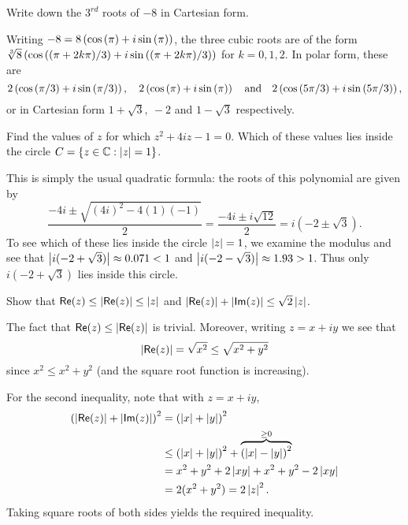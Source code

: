 \begin{questions}
\question Write down the $3^{rd}$ roots of $-8$ in Cartesian form.
\begin{answer}
Writing $-8=8 \left( \cos \left( \pi \right) + i \sin \left( \pi \right) \right)$, the three cubic roots are of the form $\sqrt[3]{8} \left( \cos \left( (\pi+2k\pi)/3 \right) + i \sin \left( (\pi+2k\pi)/3 \right) \right)$ for $k=0,1,2$.  In polar form, these are
\[
2 \left( \cos \left( \pi/3 \right) + i \sin \left( \pi/3 \right) \right), \quad 2 \left( \cos \left( \pi \right) + i \sin \left( \pi \right) \right) \quad\text{and}\quad2 \left( \cos \left( 5\pi/3 \right) + i \sin \left( 5\pi/3 \right) \right),
\]
or in Cartesian form $1+\sqrt{3},\ -2$ and $1-\sqrt{3}$ respectively.

\end{answer}

\question Find the values of $z$ for which $z^2+4iz-1=0$.  Which of these values lies inside the circle $C=\left\{z \in \mathbb{C}: \left| z \right|=1\right\}$.
\begin{answer}
This is simply the usual quadratic formula: the roots of this polynomial are given by
\[
\frac{-4i\pm \sqrt{(4i)^2-4(1)(-1)}}{2} = \frac{-4i\pm i \sqrt{12}}{2} = i (-2 \pm  \sqrt{3}).
\]
To see which of these lies inside the circle $\left| z \right|=1$, we examine the modulus and see that $\left| i(-2 + \sqrt{3}) \right| \approx 0.071<1$ and $\left| i(-2-\sqrt{3}) \right| \approx 1.93>1$. Thus only $i(-2+\sqrt{3})$ lies inside this circle.
\end{answer}


\question Show that $\textsf{Re} (z) \leq \left|  \textsf{Re} (z) \right| \leq \left| z \right|$ and $\left| \textsf{Re} (z) \right|+\left| \textsf{Im} (z) \right| \leq \sqrt{2} \left| z \right|$.
\begin{answer}
The fact that $\textsf{Re} (z) \leq \left|  \textsf{Re} (z) \right|$ is trivial.  Moreover,  writing $z=x+iy$ we see that
\[
\left| \textsf{Re}(z) \right| = \sqrt{x^2} \leq \sqrt{x^2+y^2}
\]
since $x^2 \leq x^2+y^2$ (and the square root function is increasing).

For the second inequality, note that with $z=x+iy$,
\begin{align*}
\left( \left| \textsf{Re} (z) \right|+\left| \textsf{Im} (z) \right| \right)^2 & = \left( \left| x \right|+\left| y \right| \right)^2 \\
& \leq \left( \left| x \right|+\left| y \right| \right)^2  + \overbrace{\left( \left| x \right|-\left| y \right| \right)^2}^{\geq 0}  \\
& = x^2+y^2+2\left| xy \right| + x^2 + y^2 - 2\left| xy \right| \\
& = 2(x^2+y^2) = 2 \left| z \right|^2.
\end{align*}
Taking square roots of both sides yields the required inequality.
\end{answer}
\end{questions}
